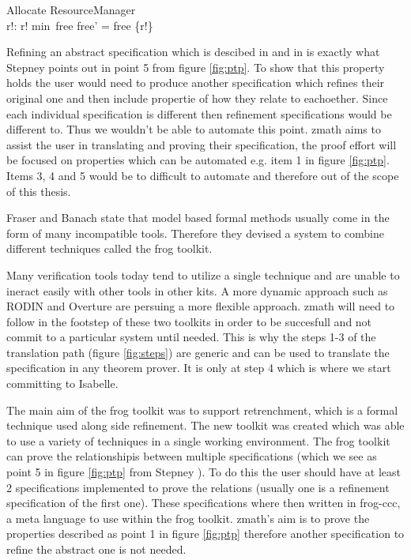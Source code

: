\begin{exam}

\begin{schema}{Allocate}
\Delta ResourceManager \\
r!: \nat
\where
r! \in min~free \land free' = free \setminus \{r!\}
\end{schema}
\label{exam:allocaterefine} 
\end{exam}

Refining an abstract specification which is descibed in \cite{Woodcock:1996:UZS:235337} and in \cite{spiveyreferencemanual} is exactly what Stepney points out in point 5 from figure \ref{fig:ptp}. To show that this property holds the user would need to produce another specification which refines their original one and then include propertie of how they relate to eachoether. Since each individual specification is different then refinement specifications would be different to. Thus we wouldn't be able to automate this point. \gls{zmath} aims to assist the user in translating and proving their specification, the proof effort will be focused on properties which can be automated e.g. item 1 in figure \ref{fig:ptp}. Items 3, 4 and 5 would be to difficult to automate and therefore out of the scope of this thesis.

Fraser and Banach \cite{DBLP:conf/sefm/FraserB07} state that model based formal methods usually come in the form of many incompatible tools. Therefore they devised a system to combine different techniques called the frog toolkit.

Many verification tools today tend to utilize a single technique and are unable to ineract easily with other tools in other kits. A more dynamic approach such as RODIN \cite{Jones05j} and Overture \cite{overture} are persuing a more flexible approach. \gls{zmath} will need to follow in the footstep of these two toolkits in order to be succesfull and not commit to a particular system until needed. This is why the steps 1-3 of the translation path (figure \ref{fig:steps}) are generic and can be used to translate the specification in any theorem prover. It is only at step 4 which is where we start committing to Isabelle.

The main aim of the frog toolkit was to support retrenchment, which is a formal technique used along side refinement. The new toolkit was created which was able to use a variety of techniques in a single working environment. The frog toolkit can prove the relationshipis between multiple specifications (which we see as point 5 in figure \ref{fig:ptp} from Stepney \cite{stepney1998tale}). To do this the user should have at least 2 specifications implemented to prove the relations (usually one is a refinement specification of the first one). These specifications where then written in frog-ccc, a meta language to use within the frog toolkit. \gls{zmath}'s aim is to prove the properties described as point 1 in figure \ref{fig:ptp} therefore another specification to refine the abstract one is not needed.

